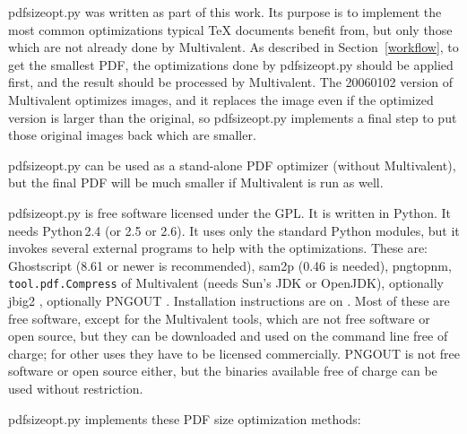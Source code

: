 \documentclass{ltugproc}
\def\cmd{\textsf}
\begin{document}
\cmd{pdfsizeopt.py} \cite{pdfsizeopt} was written as part of this work. Its purpose is to
implement the most common optimizations typical \TeX{} documents benefit
from, but only those which are not already done by Multivalent. As described
in Section~\ref{workflow}, to get the smallest PDF, the optimizations
done by \cmd{pdfsizeopt.py} should be applied first, and the result should
be processed by Multivalent. The 20060102 version of Multivalent
optimizes images, and it replaces the image even if the optimized version is
larger than the original, so \cmd{pdfsizeopt.py} implements a final step
to put those original images back which are smaller. 

\cmd{pdfsizeopt.py} can be used as a stand-alone PDF optimizer (without
Multivalent), but the final PDF will be much smaller if Multivalent
is run as well.

\cmd{pdfsizeopt.py} is free software licensed under the GPL. It is written
in Python. It needs Python\,2.4 (or 2.5 or 2.6). It uses only the standard
Python modules, but it invokes several external programs to help with the
optimizations. These are: Ghostscript (8.61 or newer is recommended),
\cmd{sam2p} \cite{sam2p} (0.46 is needed), pngtopnm,
\texttt{tool.pdf.Compress} of Multivalent
\cite{multivalent-compress-tool} (needs Sun's JDK or OpenJDK), 
optionally \cmd{jbig2} \cite{jbig2enc}, optionally PNGOUT \cite{pngout}.
Installation instructions are on \cite{pdfsizeopt-install}. Most of these
are free software, except for the Multivalent tools, which
are not free software or open source, but they can be downloaded and used on
the command line free of charge; for other uses they have to be licensed
commercially. PNGOUT is not free software or open source either, but the
binaries available free of charge can be used without restriction.

\cmd{pdfsizeopt.py} implements these PDF size optimization methods:
\end{document}

